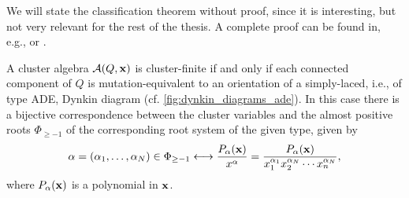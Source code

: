 We will state the classification theorem without proof, since it is interesting, but
not very relevant for the rest of the thesis. A complete proof can be found in, e.g.,
\cite{FominZelevinsky2003CAFin} or \cite{FominWilliams2021IntroductionCA_4-5}.
\begin{theorem}\label{thm:cluster_finite_classification}

	A cluster algebra $\mathcal{A} (Q, \mathbf{x})$ is cluster-finite if and only if each connected
	component of $Q$ is mutation-equivalent to an orientation of a simply-laced, i.e., of
	type ADE, Dynkin diagram (cf. \cref{fig:dynkin_diagrams_ade}). In
	this case there is a bijective correspondence between the cluster variables and the
	almost positive roots $\Phi_{\geq -1}$ of the corresponding root system of the given
	type, given by
	\begin{equation*}
		\alpha = (\alpha_1, \dots, \alpha_N) \in \Phi_{\geq -1} \longleftrightarrow \frac{P_\alpha (\mathbf{x})}{x^\alpha} = \frac{P_{\alpha}(\mathbf{x})}{x_1^{\alpha_1}x_2^{\alpha_N}\dotsb x_n^{\alpha_N}},
	\end{equation*}
	where $P_\alpha (\mathbf{x})$ is a polynomial in $\mathbf{x}$.
\end{theorem}

